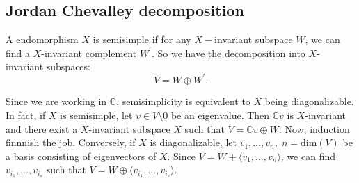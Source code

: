 \subsection{Jordan Chevalley decomposition}
\begin{dang}
    \begin{remark}
        A endomorphism $X$ is semisimple if for any $X-$invariant subspace $W$, we can find a $X$-invariant complement
        $W^\prime$. So we have the decomposition into $X$-invariant subspaces:
        \begin{equation}
            V = W\oplus W^\prime.
        \end{equation}
    \end{remark}
\end{dang}
Since we are working in $\mathbb{C}$, semisimplicity is equivalent to $X$ being diagonalizable. In fact, if $X$ is 
semisimple, let $v\in V\setminus0$ be an eigenvalue. Then $\mathbb{C}v$ is $X$-invariant and there exist a $X$-invariant 
subspace $X$ such that $V=\mathbb{C}v\oplus W$. Now, induction finnnish the job. Conversely, if $X$ is diagonalizable, let 
$v_1,\dots,v_n,\;n=\text{dim}(V)$ be a basis consisting of eigenvectors of $X$. Since $V=W+\langle v_1,\dots, v_n\rangle$, we can 
find $v_{i_1},\dots, v_{i_s}$ such that $V=W\oplus \langle v_{i_1},\dots, v_{i_s}\rangle$.

